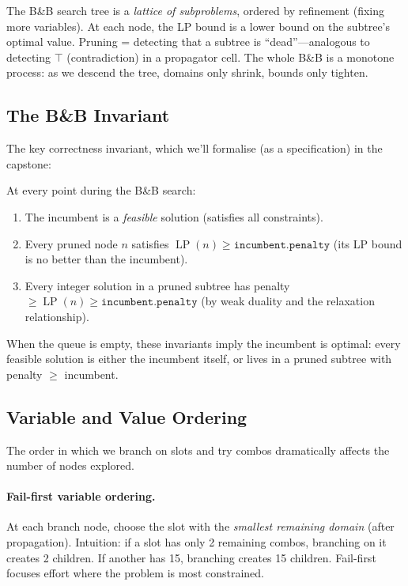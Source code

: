 \documentclass[11pt, a4paper, oneside]{book}
\newcommand{\LP}{\operatorname{LP}}
\begin{document}
\begin{crossrefbox}
The B\&B search tree is a \emph{lattice of subproblems}, ordered by
refinement (fixing more variables).  At each node, the LP bound is a
lower bound on the subtree's optimal value.  Pruning = detecting that
a subtree is ``dead''---analogous to detecting $\top$ (contradiction)
in a propagator cell.  The whole B\&B is a monotone process: as we
descend the tree, domains only shrink, bounds only tighten.
\end{crossrefbox}

\subsection{The B\&B Invariant}

The key correctness invariant, which we'll formalise (as a specification) in the capstone:

\begin{thmbox}[title={B\&B Invariant}]
At every point during the B\&B search:
\begin{enumerate}[nosep]
  \item The incumbent is a \emph{feasible} solution (satisfies all constraints).
  \item Every pruned node $n$ satisfies $\LP(n) \geq \texttt{incumbent.penalty}$
    (its LP bound is no better than the incumbent).
  \item Every integer solution in a pruned subtree has penalty $\geq \LP(n)
    \geq \texttt{incumbent.penalty}$ (by weak duality and the relaxation
    relationship).
\end{enumerate}
When the queue is empty, these invariants imply the incumbent is optimal:
every feasible solution is either the incumbent itself, or lives in a
pruned subtree with penalty $\geq$ incumbent.
\end{thmbox}

\subsection{Variable and Value Ordering}

The order in which we branch on slots and try combos dramatically affects
the number of nodes explored.

\paragraph{Fail-first variable ordering.}
At each branch node, choose the slot with the \emph{smallest remaining
domain} (after propagation).  Intuition: if a slot has only 2 remaining
combos, branching on it creates 2 children.  If another has 15, branching
creates 15 children.  Fail-first focuses effort where the problem is most
constrained.
\end{document}
